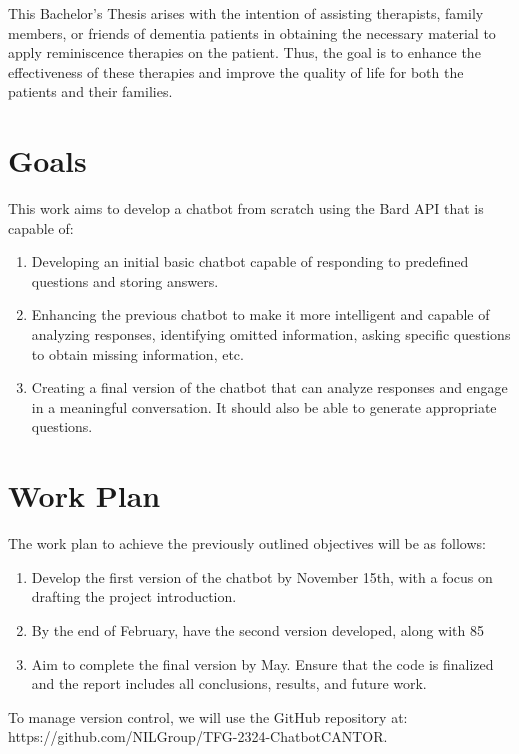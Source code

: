 This Bachelor's Thesis arises with the intention of assisting therapists, family members, or friends of dementia patients in obtaining the necessary material to apply reminiscence therapies on the patient. Thus, the goal is to enhance the effectiveness of these therapies and improve the quality of life for both the patients and their families.


\section{Goals}
This work aims to develop a chatbot from scratch using the Bard API that is capable of:
\begin{enumerate}

\item Developing an initial basic chatbot capable of responding to predefined questions and storing answers.
\item Enhancing the previous chatbot to make it more intelligent and capable of analyzing responses, identifying omitted information, asking specific questions to obtain missing information, etc.
\item Creating a final version of the chatbot that can analyze responses and engage in a meaningful conversation. It should also be able to generate appropriate questions. 
\end{enumerate}

\section{Work Plan}

The work plan to achieve the previously outlined objectives will be as follows:
\begin{enumerate}

\item Develop the first version of the chatbot by November 15th, with a focus on drafting the project introduction.

\item By the end of February, have the second version developed, along with 85%

\item Aim to complete the final version by May. Ensure that the code is finalized and the report includes all conclusions, results, and future work.

\end{enumerate}
To manage version control, we will use the GitHub repository at: https://github.com/NILGroup/TFG-2324-ChatbotCANTOR.












